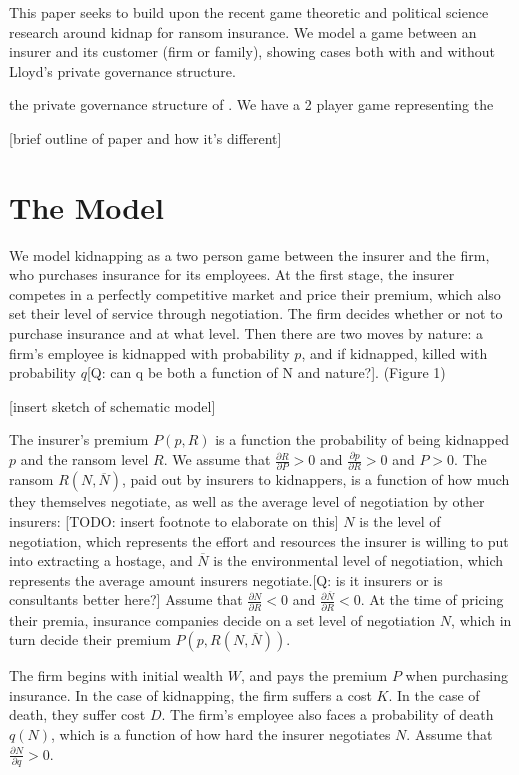 \documentclass[12pt]{article}
\begin{document}
This paper seeks to build upon the recent game theoretic and political science research around kidnap for ransom insurance. We model a game between an insurer and its customer (firm or family), showing cases both with and without Lloyd's private governance structure.

 the private governance structure of . We have a 2 player game representing the 

[brief outline of paper and how it's different]


\section{The Model}

We model kidnapping as a two person game between the insurer and the firm, who purchases insurance for its employees. At the first stage, the insurer competes in a perfectly competitive market and price their premium, which also set their level of service through negotiation. The firm decides whether or not to purchase insurance and at what level. Then there are two moves by nature: a firm's employee is kidnapped with probability $p$, and if kidnapped, killed with probability $q$[Q: can q be both a function of N and nature?]. (Figure 1)

[insert sketch of schematic model]

The insurer's premium $P(p, R)$ is a function the probability of being kidnapped $p$ and the ransom level $R$. We assume that $\frac{\partial R}{\partial P} > 0$ and $\frac{\partial p}{\partial R} > 0$ and $P > 0$. The ransom $R(N, \overline{N})$, paid out by insurers to kidnappers, is a function of how much they themselves negotiate, as well as the average level of negotiation by other insurers: [TODO: insert footnote to elaborate on this] $N$ is the level of negotiation, which represents the effort and resources the insurer is willing to put into extracting a hostage, and $\overline{N}$ is the environmental level of negotiation, which represents the average amount insurers negotiate.[Q: is it insurers or is consultants better here?] Assume that $\frac{\partial N}{\partial R} < 0$ and $\frac{\partial \overline{N}}{\partial R} < 0$. At the time of pricing their premia, insurance companies decide on a set level of negotiation $N$, which in turn decide their premium $P(p, R(N, \overline{N}))$.

The firm begins with initial wealth $W$, and pays the premium $P$ when purchasing insurance. In the case of kidnapping, the firm suffers a cost $K$. In the case of death, they suffer cost $D$. The firm's employee also faces a probability of death $q(N)$, which is a function of how hard the insurer negotiates $N$. Assume that $\frac{\partial N}{\partial q} > 0$.
\end{document}
